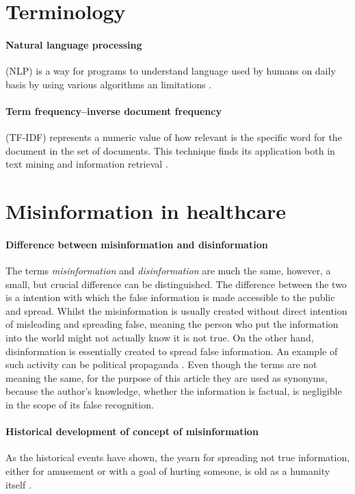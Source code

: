 \documentclass[11pt ,english,a4paper]{article}
\begin{document}
\section{Terminology}\label{ter}

\paragraph{Natural language processing} (NLP) is a way for programs to understand language used by humans on daily basis by using various algorithms an limitations \cite{nad11natural}.

\paragraph{Term frequency–inverse document frequency} (TF-IDF) represents a numeric value of how relevant is the specific word for the document in the set of documents. This technique finds its application both in text mining and information retrieval \cite{chr16tfidf}. 

\section{Misinformation in healthcare}\label{mih}

\paragraph{Difference between misinformation and disinformation}
The terms \emph{misinformation} and \emph{disinformation} are much the same, however, a small, but crucial difference can be distinguished. The difference between the two is a intention with which the false information is made accessible to the public and spread. Whilst the misinformation is usually created without direct intention of misleading and spreading false, meaning the person who put the information into the world might not actually know it is not true. On the other hand, disinformation is essentially created to spread false information. An example of such activity can be political propaganda \cite{gu20misinfo} \cite{cook15misinfo}. Even though the terms are not meaning the same, for the purpose of this article they are used as synonyms, because the author's knowledge, whether the information is factual, is negligible in the scope of its false recognition.

\paragraph{Historical development of concept of misinformation}%
As the historical events have shown, the yearn for spreading not true information, either for amusement or with a goal of hurting someone, is old as a humanity itself \cite{bur17history}.%
\end{document}
